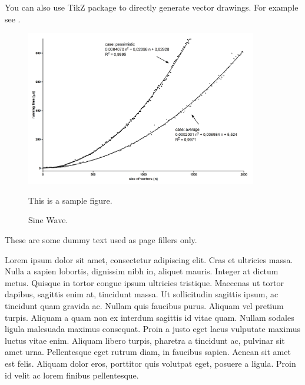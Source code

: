 You can also use TikZ package to directly generate vector drawings. For example see .

\begin{figure}[!tb]
  \centering
  \includegraphics[width=0.9\textwidth]{figures/sample}
  \caption{This is a sample figure.}
  \caption{Sine Wave.}
  \label{fig:sinewave}
\end{figure}

These are some dummy text used as page fillers only.

Lorem ipsum dolor sit amet, consectetur adipiscing elit. Cras et
ultricies massa. Nulla a sapien lobortis, dignissim nibh in, aliquet
mauris. Integer at dictum metus. Quisque in tortor congue ipsum
ultricies tristique. Maecenas ut tortor dapibus, sagittis enim at,
tincidunt massa. Ut sollicitudin sagittis ipsum, ac tincidunt quam
gravida ac. Nullam quis faucibus purus. Aliquam vel pretium
turpis. Aliquam a quam non ex interdum sagittis id vitae quam. Nullam
sodales ligula malesuada maximus consequat. Proin a justo eget lacus
vulputate maximus luctus vitae enim. Aliquam libero turpis, pharetra a
tincidunt ac, pulvinar sit amet urna. Pellentesque eget rutrum diam,
in faucibus sapien. Aenean sit amet est felis. Aliquam dolor eros,
porttitor quis volutpat eget, posuere a ligula. Proin id velit ac
lorem finibus pellentesque.

